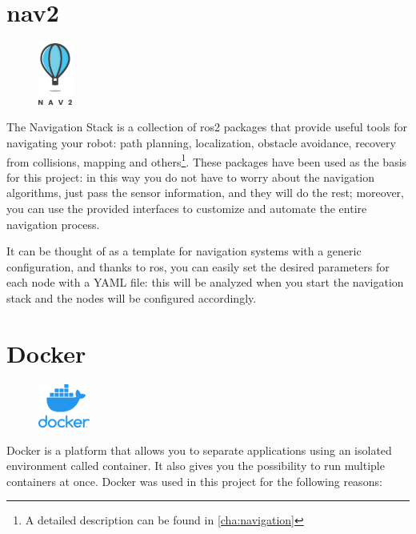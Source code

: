 \section{\acrfull{nav2}}

\begin{figure}
    \includegraphics[width=0.1\textwidth]{images/nav2_logo}
\end{figure}

The Navigation Stack is a collection of \acrshort{ros}2 packages that provide useful tools for navigating your robot: path planning, localization, obstacle avoidance, recovery from collisions, mapping and others\footnote{A detailed description can be found in \autoref{cha:navigation}}. These packages have been used as the basis for this project: in this way you do not have to worry about the navigation algorithms, just pass the sensor information, and they will do the rest; moreover, you can use the provided interfaces to customize and automate the entire navigation process.

It can be thought of as a template for navigation systems with a generic configuration, and thanks to \acrshort{ros}, you can easily set the desired parameters for each node with a YAML file: this will be analyzed when you start the navigation stack and the nodes will be configured accordingly.

\section{Docker}
  
\begin{figure}
    \includegraphics[width=0.15\textwidth]{images/docker}
\end{figure}
  
Docker is a platform that allows you to separate applications using an isolated environment called container. It also gives you the possibility to run multiple containers at once. Docker was used in this project for the following reasons:
  
